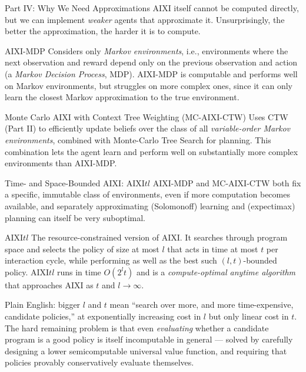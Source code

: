 \documentclass[aspectratio=169,10pt]{beamer}
\begin{document}
\begin{frame}{Part IV: Why We Need Approximations}
  AIXI itself cannot be computed directly, but we can implement
  \emph{weaker} agents that approximate it. Unsurprisingly, the better the
  approximation, the harder it is to compute.

  \begin{block}{AIXI-MDP}
    Considers only \emph{Markov environments}, i.e., environments where the
    next observation and reward depend only on the previous observation and
    action (a \emph{Markov Decision Process}, MDP). AIXI-MDP is computable
    and performs well on Markov environments, but struggles on more complex
    ones, since it can only learn the closest Markov approximation to the
    true environment.
  \end{block}

  \begin{block}{Monte Carlo AIXI with Context Tree Weighting (MC-AIXI-CTW)}
    Uses CTW (Part II) to efficiently update beliefs over the class of all
    \emph{variable-order Markov environments}, combined with Monte-Carlo
    Tree Search for planning. This combination lets the agent learn and
    perform well on substantially more complex environments than AIXI-MDP.
  \end{block}
\end{frame}

\begin{frame}{Time- and Space-Bounded AIXI: AIXI$tl$}
  AIXI-MDP and MC-AIXI-CTW both fix a specific, immutable class of
  environments, even if more computation becomes available, and separately
  approximating (Solomonoff) learning and (expectimax) planning can itself
  be very suboptimal.

  \begin{block}{AIXI$tl$}
    The resource-constrained version of AIXI. It searches through program
    space and selects the policy of size at most $l$ that acts in time at
    most $t$ per interaction cycle, while performing as well as the best
    such $(l,t)$-bounded policy. AIXI$tl$ runs in time $O(2^l t)$ and is a
    \emph{compute-optimal anytime algorithm} that approaches AIXI as $t$ and
    $l \to \infty$.
  \end{block}
  Plain English: bigger $l$ and $t$ mean ``search over more, and more
  time-expensive, candidate policies,'' at exponentially increasing cost in
  $l$ but only linear cost in $t$. The hard remaining problem is that even
  \emph{evaluating} whether a candidate program is a good policy is itself
  incomputable in general --- solved by carefully designing a lower
  semicomputable universal value function, and requiring that policies
  provably conservatively evaluate themselves.
\end{frame}
\end{document}
